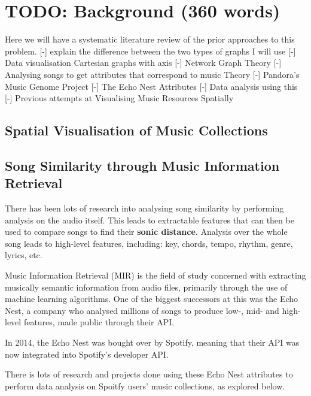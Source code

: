 \chapter{TODO: Background (360 words)}
Here we will have a systematic literature review of the prior approaches to this problem.
[-] explain the difference between the two types of graphs I will use
    [-] Data visualisation Cartesian graphs with axis
    [-] Network Graph Theory
[-] Analysing songs to get attributes that correspond to music Theory
    [-] Pandora's Music Genome Project    
    [-] The Echo Nest Attributes
        [-] Data analysis using this
[-] Previous attempts at Visualising Music Resources Spatially

\section{Spatial Visualisation of Music Collections}

\section{Song Similarity through Music Information Retrieval}
There has been lots of research into analysing song similarity by performing analysis on the audio itself. This leads to extractable features that can then be used to compare songs to find their \textbf{sonic distance}.
Analysis over the whole song leads to high-level features, including: key, chords, tempo, rhythm, genre, lyrics, etc.

Music Information Retrieval (MIR) is the field of study concerned with extracting musically semantic information from audio files, primarily through the use of machine learning algorithms. One of the biggest successors at this was the Echo Nest, a company who analysed millions of songs to produce low-, mid- and high-level features, made public through their API.

In 2014, the Echo Nest was bought over by Spotify, meaning that their API was now integrated into Spotify's developer API.

There is lots of research and projects done using these Echo Nest attributes to perform data analysis on Spoitfy users' music collections, as explored below.

